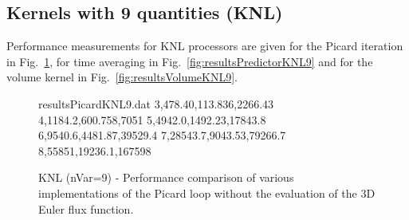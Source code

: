 \documentclass{acm_proc_article-sp}
\begin{document}
\subsection{Kernels with 9 quantities (KNL)} \label{sec:app2}

Performance measurements for KNL processors are given for the Picard iteration in Fig.~\ref{fig:resultsPicardKNL9}, for time averaging in Fig.~\ref{fig:resultsPredictorKNL9} and for the volume kernel in Fig.~\ref{fig:resultsVolumeKNL9}.

\begin{figure}[!h]
\begin{filecontents}{resultsPicardKNL9.dat}
3,478.40,113.836,2266.43
4,1184.2,600.758,7051
5,4942.0,1492.23,17843.8
6,9540.6,4481.87,39529.4
7,28543.7,9043.53,79266.7
8,55851,19236.1,167598
\end{filecontents}
\pgfplotsset{scaled y ticks=false}
\caption{KNL (nVar=9) - Performance comparison of various implementations of the Picard loop without the evaluation of the 3D Euler flux function.}\label{fig:resultsPicardKNL9}
\end{figure}
\end{document}
